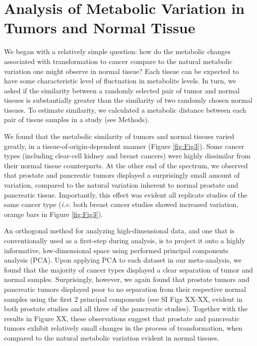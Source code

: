 \documentclass[10pt]{article}
\begin{document}
\section{Analysis of Metabolic Variation in Tumors and Normal Tissue}

We began with a relatively simple question: how do the metabolic changes associated with transformation to cancer compare to the natural metabolic variation one might observe in normal tissue? Each tissue can be expected to have some characteristic level of fluctuation in metabolite levels. In turn, we asked if the similarity between a randomly selected pair of tumor and normal tissues is substantially greater than the similarity of two randomly chosen normal tissues. To estimate similarity, we calculated a metabolic distance between each pair of tissue samples in a study (see Methods). 

We found that the metabolic similarity of tumors and normal tissues varied greatly, in a tissue-of-origin-dependent manner (Figure \ref{fig:Fig3}). Some cancer types (including clear-cell kidney and breast cancers) were highly dissimilar from their normal tissue counterparts. At the other end of the spectrum, we observed that prostate and pancreatic tumors displayed a surprisingly small amount of variation, compared to the natural variation inherent to normal prostate and pancreatic tissue. Importantly, this effect was evident all replicate studies of the same cancer type (\textit{i.e.} both breast cancer studies showed increased variation, orange bars in Figure \ref{fig:Fig3}).

An orthogonal method for analyzing high-dimensional data, and one that is conventionally used as a first-step during analysis, is to project it onto a highly informative, low-dimensional space using performed principal components analysis (PCA).  Upon applying PCA to each dataset in our meta-analysis, we found that the majority of cancer types displayed a clear separation of tumor and normal samples. Surprisingly, however, we again found that prostate tumors and pancreatic tumors displayed poor to no separation from their respective normal samples using the first 2 principal components (see SI Figs XX-XX, evident in both prostate studies and all three of the pancreatic studies). Together with the results in Figure XX, these observations suggest that prostate and pancreatic tumors exhibit relatively small changes in the process of transformation, when compared to the natural metabolic variation evident in normal tissues.
\end{document}
